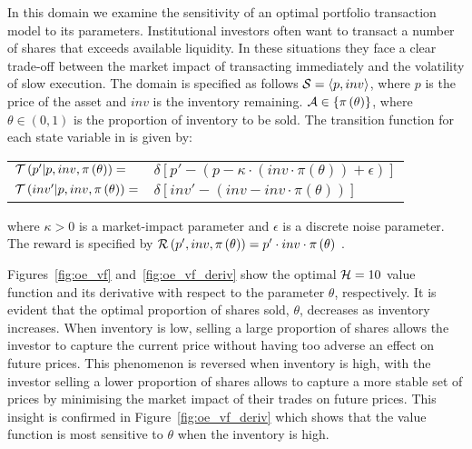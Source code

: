 In this domain we examine the sensitivity of an optimal portfolio transaction model to its parameters. Institutional investors often want to transact a number of shares that exceeds available liquidity. In these situations they face a clear trade-off between the market impact of transacting immediately and the volatility of slow execution. The domain is specified as follows {\footnotesize $ \mathcal{S} = \left\langle p, inv \right\rangle$}, where $ p $ is the price of the asset and $ inv $ is the inventory remaining. {\footnotesize $ \mathcal{A} \in \left\lbrace \pi\left( \theta \right) \right\rbrace$}, where {\footnotesize $ \theta \in \left( 0, 1\right)$} is the proportion of inventory to be sold. The transition function {\footnotesize \Transition} for each state variable in {\footnotesize \State} is given by:
{\footnotesize 
    \abovedisplayskip=5pt
    \belowdisplayskip=0pt
    \renewcommand{\arraystretch}{1.5}
    \begin{tabular}{ll}
        $\mathcal{T}\left( p' | p, inv, \pi\left( \theta \right) \right) = $ & $\delta \left[ p' - (p - \kappa \cdot (inv \cdot \pi\left( \theta \right)) + \epsilon) \right] $ \\
        $\mathcal{T}\left( inv' | p, inv, \pi\left( \theta \right) \right) = $ & $\delta \left[ inv' - (inv - inv \cdot \pi\left( \theta \right)) \right] $ \\
    \end{tabular}
}%
where {\footnotesize $ \kappa > 0$} is a market-impact parameter and {\footnotesize $ \epsilon $} is a discrete noise parameter. The reward is specified by {\footnotesize $ \mathcal{R}\left(p', inv, \pi\left( \theta \right) \right) = p' \cdot inv \cdot \pi\left( \theta \right)$ }.

Figures~\ref{fig:oe_vf} and~\ref{fig:oe_vf_deriv} show the optimal {\footnotesize $ \mathcal{H} = 10 $} value function and its derivative with respect to the parameter {\footnotesize $ \theta  $}, respectively. It is evident that the optimal proportion of shares sold, {\footnotesize $ \theta $}, decreases as inventory increases. When inventory is low, selling a large proportion of shares allows the investor to capture the current price without having too adverse an effect on future prices. This phenomenon is reversed when inventory is high, with the investor selling a lower proportion of shares allows to capture a more stable set of prices by minimising the market impact of their trades on future prices. This insight is confirmed in Figure~\ref{fig:oe_vf_deriv} which shows that the value function is most sensitive to {\footnotesize $ \theta $} when the inventory is high.

